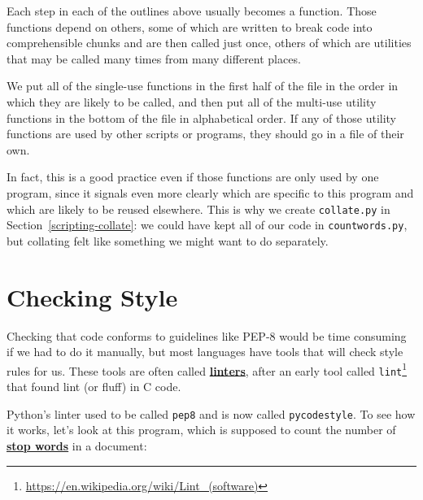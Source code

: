 \documentclass[
]{krantz}
\renewcommand{\href}[2]{#2\footnote{\url{#1}}}
\newcommand{\gref}[2]{\hyperlink{#2}{\textbf{#1}}}
\begin{document}
Each step in each of the outlines above usually becomes a function.
Those functions depend on others,
some of which are written to break code into comprehensible chunks and are then called just once,
others of which are utilities that may be called many times from many different places.

We put all of the single-use functions in the first half of the file
in the order in which they are likely to be called,
and then put all of the multi-use utility functions in the bottom of the file in alphabetical order.
If any of those utility functions are used by other scripts or programs,
they should go in a file of their own.

In fact,
this is a good practice even if those functions are only used by one program,
since it signals even more clearly which are specific to this program
and which are likely to be reused elsewhere.
This is why we create \texttt{collate.py} in Section~\ref{scripting-collate}:
we could have kept all of our code in \texttt{countwords.py},
but collating felt like something we might want to do separately.

\hypertarget{style-check}{%
\section{Checking Style}\label{style-check}}

Checking that code conforms to guidelines like PEP-8 would be time consuming
if we had to do it manually,
but most languages have tools that will check style rules for us.
These tools are often called \gref{linters}{linter},
after an early tool called \href{https://en.wikipedia.org/wiki/Lint_(software)}{\texttt{lint}} that found lint (or fluff) in C code.

Python's linter used to be called \texttt{pep8} and is now called \texttt{pycodestyle}.
To see how it works,
let's look at this program,
which is supposed to count the number of \gref{stop words}{stop\_word} in a document:
\end{document}
